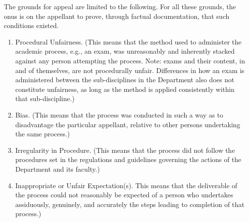 \documentclass[12pt]{article}
\newcommand\eg{e.g.\xspace}
\newcommand{\parnum}{\arabic{parcount}}
\newcounter{parcount}
\newcommand\p{\stepcounter{parcount}\leavevmode{\raisebox{0.2ex}{\scriptsize[\parnum]}}\hspace{0.2em}}
\begin{document}
\p The grounds for appeal are limited to the following.  For all these grounds,
the onus is on the appellant to prove, through factual documentation, that such
conditions existed. 


\begin{enumerate}

    \item Procedural Unfairness.  (This means that the method used to
        administer the academic process, \eg, an exam, was unreasonably and
        inherently stacked against any person attempting the process.  Note:
        exams and their content, in and of themselves, are not procedurally
        unfair.  Differences in how an exam is administered between the
        sub-disciplines in the Department also does not constitute unfairness,
        as long as the method is applied consistently within that
        sub-discipline.)

    \item Bias. (This means that the process was conducted in such a way as to
        disadvantage the particular appellant, relative to other persons
        undertaking the same process.)

    \item Irregularity in Procedure. (This means that the process did not
        follow the procedures set in the regulations and guidelines governing
        the actions of the Department and its faculty.)

    \item Inappropriate or Unfair Expectation(s). This means that the
        deliverable of the process could not reasonably be expected of a person
        who undertakes assiduously, genuinely, and accurately the steps leading
        to completion of that process.) 

\end{enumerate}

%
%
%
\end{document}

